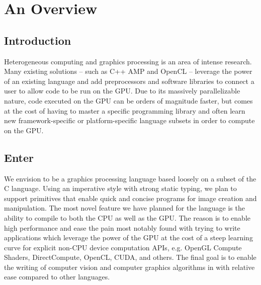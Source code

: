 \chapter{An Overview}
\section{Introduction}
Heterogeneous computing and graphics processing is an area of intense research. Many existing solutions -- such as C++ AMP \cite{clang-cxx-amp} and OpenCL \cite{opencl} -- leverage the power of an existing language and add preprocessors and software libraries to connect a user to allow code to be run on the GPU. Due to its massively parallelizable nature, code executed on the GPU can be orders of magnitude faster, but comes at the cost of having to master a specific programming library and often learn new framework-specific or platform-specific language subsets in order to compute on the GPU.

\section{Enter \lepix{}}
We envision \lepix to be a graphics processing language based loosely on a subset of the C language. Using an imperative style with strong static typing, we plan to support primitives that enable quick and concise programs for image creation and manipulation. The most novel feature we have planned for the language is the ability to compile to both the CPU as well as the GPU. The reason is to enable high performance and ease the pain most notably found with trying to write applications which leverage the power of the GPU at the cost of a steep learning curve for explicit non-CPU device computation APIs, e.g. OpenGL Compute Shaders, DirectCompute, OpenCL, CUDA, and others. The final goal is to enable the writing of computer vision and computer graphics algorithms in \lepix{} with relative ease compared to other languages.